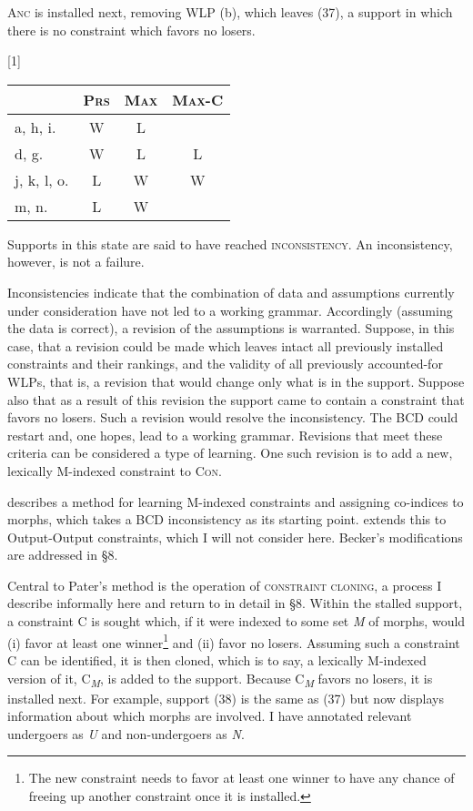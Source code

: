 \documentclass[output=paper,
modfonts
]{LSP/langsci}
\begin{document}
\textsc{Anc} is installed next, removing WLP (b), which leaves (37), a support in which there is no constraint which favors no losers. 

\ea 
\renewcommand*\arraystretch{1.2}
\scalebox{1}[1]{\begin{tabular}[t]{|l||c||c|c|}
\firsthline & \textsc{Prs} & \textsc{Max} & \textsc{Max-C} \\
\hline
\hline a, h, i. & W & L & \\
\hline d, g. & W & L & L  \\
\hline j, k, l, o. & L & W & W \\
\hline m, n. & L & W & \\
\hline \end{tabular}} \renewcommand*\arraystretch{1}
\z

\noindent Supports in this state are said to have reached \textsc{inconsistency}. An inconsistency, however, is not a failure. 

Inconsistencies indicate that the combination of data and assumptions currently under consideration have not led to a working grammar. Accordingly (assuming the data is correct), a revision of the assumptions is warranted. Suppose, in this case, that a revision could be made which leaves intact all previously installed constraints and their rankings, and the validity of all previously accounted-for WLPs, that is, a revision that would change only what is in the support. Suppose also that as a result of this revision the support came to contain a constraint that favors no losers. Such a revision would resolve the inconsistency. The BCD could restart and, one hopes, lead to a working grammar. Revisions that meet these criteria can be considered a type of learning. One such revision is to add a new, lexically M-indexed constraint to \textsc{Con}. 

\citet{pater2009r} describes a method for learning M-indexed constraints and assigning co-indices to morphs, which takes a BCD inconsistency as its starting point. \citet{coetzee2009} extends this to Output-Output constraints, which I will not consider here. Becker's modifications \citep{becker2009,becker2011r} are addressed in §8. 

Central to Pater's method is the operation of \textsc{constraint cloning}, a process I describe informally here and return to in detail in §8. Within the stalled support, a constraint C is sought which, if it were indexed to some set \textit{M} of morphs, would (i) favor at least one winner\footnote{The new constraint needs to favor at least one winner to have any chance of freeing up another constraint once it is installed.} and (ii) favor no losers. Assuming such a constraint C can be identified, it is then cloned, which is to say, a lexically M-indexed version of it, C\textit{\textsubscript{M}}, is added to the support. Because C\textit{\textsubscript{M}} favors no losers, it is installed next. For example, support (38) is the same as (37) but now displays information about which morphs are involved. I have annotated relevant undergoers as \textit{U} and non-undergoers as \textit{N}.
\end{document}
